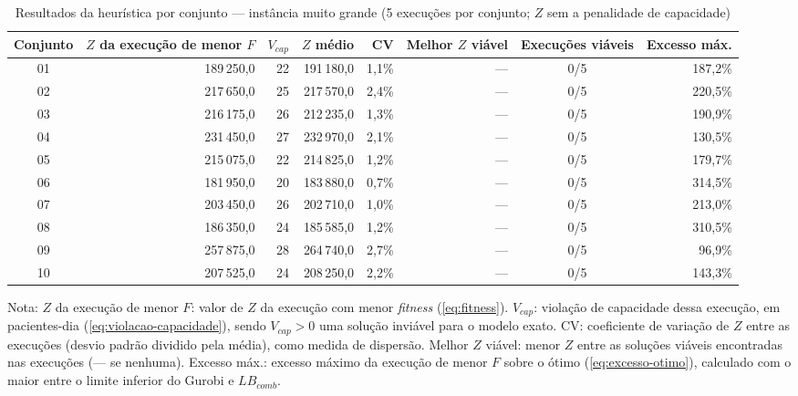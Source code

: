 \begin{table}[htbp]
    \caption{Resultados da heurística por conjunto --- instância muito grande (5 execuções por conjunto; $Z$ sem a penalidade de capacidade)}
    \label{tab:res-z-muito-grande}
    \centering
    \begin{adjustbox}{max width=\textwidth}
    \begin{tabular}{crrrrrcr}
        \hline
        \textbf{Conjunto} & \textbf{$Z$ da execução de menor $F$} & \textbf{$V_{cap}$} & \textbf{$Z$ médio} & \textbf{CV} & \textbf{Melhor $Z$ viável} & \textbf{Execuções viáveis} & \textbf{Excesso máx.} \\
        \hline
        01 & 189\,250,0 & 22 & 191\,180,0 & 1,1\% & --- & 0/5 & 187,2\% \\
        02 & 217\,650,0 & 25 & 217\,570,0 & 2,4\% & --- & 0/5 & 220,5\% \\
        03 & 216\,175,0 & 26 & 212\,235,0 & 1,3\% & --- & 0/5 & 190,9\% \\
        04 & 231\,450,0 & 27 & 232\,970,0 & 2,1\% & --- & 0/5 & 130,5\% \\
        05 & 215\,075,0 & 22 & 214\,825,0 & 1,2\% & --- & 0/5 & 179,7\% \\
        06 & 181\,950,0 & 20 & 183\,880,0 & 0,7\% & --- & 0/5 & 314,5\% \\
        07 & 203\,450,0 & 26 & 202\,710,0 & 1,0\% & --- & 0/5 & 213,0\% \\
        08 & 186\,350,0 & 24 & 185\,585,0 & 1,2\% & --- & 0/5 & 310,5\% \\
        09 & 257\,875,0 & 28 & 264\,740,0 & 2,7\% & --- & 0/5 & 96,9\% \\
        10 & 207\,525,0 & 24 & 208\,250,0 & 2,2\% & --- & 0/5 & 143,3\% \\
        \hline
    \end{tabular}
    \end{adjustbox}
    \par\smallskip
    {\footnotesize Nota: $Z$ da execução de menor $F$: valor de $Z$ da execução com menor \textit{fitness} (\autoref{eq:fitness}). $V_{cap}$: violação de capacidade dessa execução, em pacientes-dia (\autoref{eq:violacao-capacidade}), sendo $V_{cap} > 0$ uma solução inviável para o modelo exato. CV: coeficiente de variação de $Z$ entre as execuções (desvio padrão dividido pela média), como medida de dispersão. Melhor $Z$ viável: menor $Z$ entre as soluções viáveis encontradas nas execuções (--- se nenhuma). Excesso máx.: excesso máximo da execução de menor $F$ sobre o ótimo (\autoref{eq:excesso-otimo}), calculado com o maior entre o limite inferior do Gurobi e $LB_{comb}$.}
\end{table}
